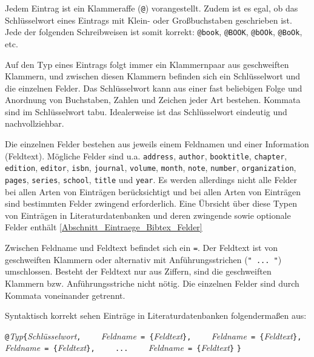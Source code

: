\documentclass[a4paper,10pt,twoside]{scrbook}
\begin{document}
{Jedem Eintrag ist ein Klammeraffe (\verb!@!) vorangestellt. Zudem ist es egal, ob das Schlüsselwort eines
Eintrags mit Klein- oder Großbuchstaben 
geschrieben ist. Jede der folgenden Schreibweisen ist somit korrekt: \verb!@book!, \verb!@BOOK!, 
\verb!@bOOk!, \verb!@BoOk!, etc.

Auf den Typ eines Eintrags folgt immer ein Klammernpaar 
aus geschweiften Klammern, und
zwischen diesen Klammern befinden sich ein Schlüsselwort und 
die einzelnen Felder.
Das Schlüsselwort kann aus einer fast beliebigen
Folge und Anordnung von Buchstaben, 
Zahlen und Zeichen jeder Art bestehen. 
Kommata sind im Schlüsselwort tabu. 
Idealerweise ist das Schlüsselwort eindeutig 
und nachvollziehbar.

Die einzelnen Felder bestehen 
aus jeweils einem Feldnamen
und einer Information (Feldtext).
Mögliche Felder sind u.a. \texttt{address}, \texttt{author}, \texttt{booktitle}, \texttt{chapter}, \texttt{edition}, \texttt{editor}, \texttt{isbn}, \texttt{journal}, \texttt{volume}, \texttt{month}, \texttt{note}, \texttt{number}, \texttt{organization}, \texttt{pages}, \texttt{series}, \texttt{school}, \texttt{title} und \texttt{year}. Es werden allerdings nicht alle Felder bei allen Arten von Einträgen berücksichtigt und bei allen Arten von Einträgen sind bestimmten Felder zwingend erforderlich. Eine Übrsicht über diese Typen von Einträgen in Literaturdatenbanken und deren zwingende sowie optionale Felder enthält \ref{Abschnitt_Eintraege_Bibtex_Felder}

Zwischen Feldname und Feldtext befindet sich ein \verb!=!. Der Feldtext ist von geschweiften Klammern oder alternativ mit Anführungsstrichen (\verb!" ... "!) umschlossen. Besteht der Feldtext nur aus Ziffern, sind die geschweiften Klammern bzw. Anführungsstriche nicht nötig.
Die einzelnen Felder sind durch Kommata voneinander getrennt.

Syntaktisch korrekt sehen Einträge in Literaturdatenbanken folgendermaßen aus: 


\begin{boxedminipage}{\textwidth}
\verb!@!\textsl{Typ}\verb!{!\textsl{Schlüsselwort}\verb!,!\newline
\verb!    !\textsl{Feldname}\verb! = {!\textsl{Feldtext}\verb!},! \newline
\verb!    !\textsl{Feldname}\verb! = {!\textsl{Feldtext}\verb!},! \newline
\verb!    !\textsl{Feldname}\verb! = {!\textsl{Feldtext}\verb!},! \newline
\verb!    !\verb!...! \newline
\verb!    !\textsl{Feldname}\verb! = {!\textsl{Feldtext}\verb!}! \newline
\verb!}!
\end{boxedminipage}





}
\end{document}
